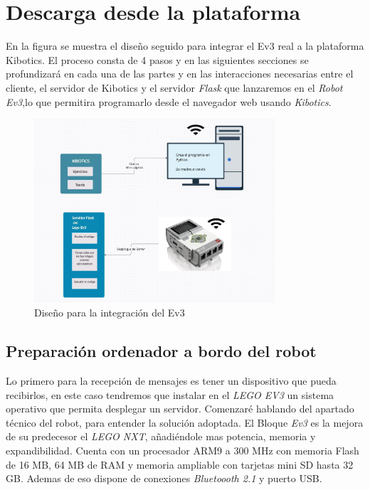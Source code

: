 \section{Descarga desde la plataforma}

En la figura se muestra el diseño seguido para integrar el Ev3 real a la plataforma Kibotics. El proceso consta de 4 pasos y en las siguientes secciones se profundizará en cada una de las partes y en las interacciones necesarias entre el cliente, el servidor de Kibotics y el servidor \textit{Flask} que lanzaremos en el \textit{Robot Ev3},lo que permitira programarlo desde el navegador web usando  \textit{Kibotics}.

\begin{figure}[h!]
  \centering
    \includegraphics[width=0.8\textwidth]{img/esquema.JPG}
  \caption{Diseño para la integración del Ev3}
  \label{comunicacion}
\end{figure}

\subsection{Preparación ordenador a bordo del robot}
Lo primero para la recepción de mensajes es tener un dispositivo que pueda recibirlos, en este caso tendremos que instalar en el \textit{LEGO EV3} un sistema operativo que permita desplegar un servidor. Comenzaré hablando del apartado técnico del robot, para entender la solución adoptada. El Bloque \textit{Ev3} es la mejora de su predecesor el \textit{LEGO NXT}, añadiéndole mas potencia, memoria y expandibilidad. Cuenta con un procesador ARM9 a 300 MHz con memoria Flash de 16 MB, 64 MB de RAM y memoria ampliable con tarjetas mini SD hasta 32 GB. Ademas de eso dispone de conexiones \textit{Bluetoooth 2.1} y puerto USB. 

